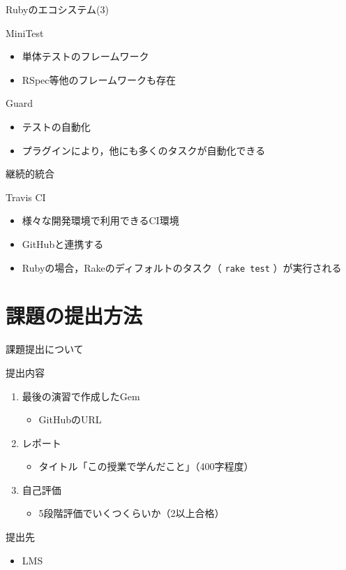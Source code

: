 \documentclass[t, aspectratio=169]{beamer}
\begin{document}
\begin{frame}[label=sec-8-1-3]{Rubyのエコシステム(3)}
\begin{block}{MiniTest}
\begin{itemize}
\item 単体テストのフレームワーク
\item RSpec等他のフレームワークも存在
\end{itemize}
\end{block}
\begin{block}{Guard}
\begin{itemize}
\item テストの自動化
\item プラグインにより，他にも多くのタスクが自動化できる
\end{itemize}
\end{block}
\end{frame}

\begin{frame}[fragile,label=sec-8-1-4]{継続的統合}
 \begin{block}{Travis CI}
\begin{itemize}
\item 様々な開発環境で利用できるCI環境
\item GitHubと連携する
\item Rubyの場合，Rakeのディフォルトのタスク（ \texttt{rake test} ）が実行される
\end{itemize}
\end{block}
\end{frame}

\section{課題の提出方法}
\label{sec-8-2}
\begin{frame}[label=sec-8-2-1]{課題提出について}
\begin{block}{提出内容}
\begin{enumerate}
\item 最後の演習で作成したGem
\begin{itemize}
\item GitHubのURL
\end{itemize}
\item レポート
\begin{itemize}
\item タイトル「この授業で学んだこと」（400字程度）
\end{itemize}
\item 自己評価
\begin{itemize}
\item 5段階評価でいくつくらいか（2以上合格）
\end{itemize}
\end{enumerate}
\end{block}
\begin{block}{提出先}
\begin{itemize}
\item LMS
\end{itemize}
\end{block}
\end{frame}
\end{document}
